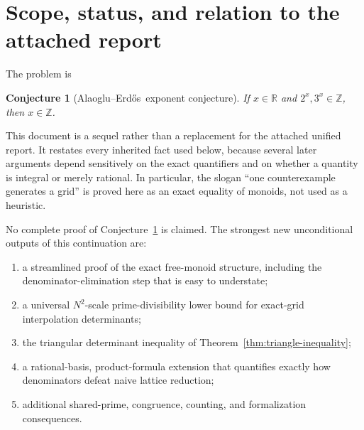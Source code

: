 \documentclass[11pt]{article}
\newtheorem{conjecture}[theorem]{Conjecture}
\theoremstyle{definition}
\newcommand{\Z}{\mathbb Z}
\newcommand{\R}{\mathbb R}
\newcommand{\AE}{Alaoglu--Erd\H{o}s}
\begin{document}
\begin{abstract}
A proof-producing finite verification, using directed interval arithmetic and
an explicit logarithmic-series remainder, additionally rules out every
$A=2^\beta\le100{,}000$ except the known power-of-two cases.  Thus any
counterexample would have $A>100{,}000$ and
$\beta>\log_2(100{,}000)\approx16.6096404744$.


No complete unconditional proof of the conjecture is claimed here.  Every new
statement is labelled according to whether it is proved, computationally
certified, conditional, or proposed as a research direction.
\end{abstract}

\tableofcontents
\clearpage

\section{Scope, status, and relation to the attached report}

The problem is
\begin{conjecture}[\AE\ exponent conjecture]\label{conj:AE}
If $x\in\R$ and $2^x,3^x\in\Z$, then $x\in\Z$.
\end{conjecture}

This document is a sequel rather than a replacement for the attached unified
report.  It restates every inherited fact used below, because several later
arguments depend sensitively on the exact quantifiers and on whether a
quantity is integral or merely rational.  In particular, the slogan ``one
counterexample generates a grid'' is proved here as an exact equality of
monoids, not used as a heuristic.

No complete proof of Conjecture~\ref{conj:AE} is claimed.  The strongest new
unconditional outputs of this continuation are:
\begin{enumerate}
\item a streamlined proof of the exact free-monoid structure, including the
      denominator-elimination step that is easy to understate;
\item a universal $N^2$-scale prime-divisibility lower bound for exact-grid
      interpolation determinants;
\item the triangular determinant inequality of
      Theorem~\ref{thm:triangle-inequality};
\item a rational-basis, product-formula extension that quantifies exactly how
      denominators defeat naive lattice reduction;
\item additional shared-prime, congruence, counting, and formalization
      consequences.
\end{enumerate}
\end{document}

